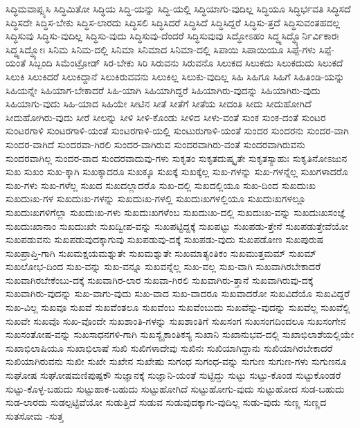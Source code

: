 {ಸಿದ್ಧಿಮವಾಪ್ಸ್ಯಸಿ
ಸಿದ್ಧಿಮಿತೋ
ಸಿದ್ಧಿಯ
ಸಿದ್ಧಿ-ಯನ್ನು
ಸಿದ್ಧಿ-ಯಲ್ಲಿ
ಸಿದ್ಧಿಯಾಗು-ವುದಿಲ್ಲ
ಸಿದ್ಧಿಯೂ
ಸಿದ್ಧಿರ್ಭವತಿ
ಸಿದ್ಧಿಸದೆ
ಸಿದ್ಧಿಸದೇ
ಸಿದ್ಧಿಸ-ಬೇಕು
ಸಿದ್ಧಿಸ-ಲಾರದು
ಸಿದ್ಧಿಸಲಿ
ಸಿದ್ಧಿಸಿದರೆ
ಸಿದ್ಧಿಸಿದೆ
ಸಿದ್ಧಿಸಿದ್ದರೆ
ಸಿದ್ಧಿಸು-ತ್ತದೆ
ಸಿದ್ಧಿಸುವಂತಹದಲ್ಲ
ಸಿದ್ಧಿಸುವು
ಸಿದ್ಧಿಸು-ವುದಿಲ್ಲ
ಸಿದ್ಧಿಸು-ವುದು
ಸಿದ್ಧಿಸುವು-ದೆಂದರೆ
ಸಿದ್ಧಿಸುವುವು
ಸಿದ್ಧೋಽಹಂ
ಸಿದ್ಧ್ಯಸಿದ್ಧ್ಯೊರ್ನಿರ್ವಿಕಾರಃ
ಸಿದ್ಧ್ಯಸಿದ್ಧ್ಯೋಃ
ಸಿನಿಮ
ಸಿನಿಮ-ದಲ್ಲಿ
ಸಿನಿಮಾ
ಸಿನಿಮಾದ
ಸಿನಿಮಾ-ದಲ್ಲಿ
ಸಿಪಾಯಿ
ಸಿಪಾಯಿಯೂ
ಸಿಪ್ಪೆ-ಗಳು
ಸಿಪ್ಪೆ-ಯಂತೆ
ಸಿಬ್ಬಂದಿ
ಸಿಮೆಂಟ್ರೋಡ್
ಸಿರ-ಬೇಕು
ಸಿರಿ
ಸಿರುವನು
ಸಿರುವನೊ
ಸಿಲುಕದ
ಸಿಲುಕದು
ಸಿಲುಕದುದು
ಸಿಲುಕದೆ
ಸಿಲುಕಿ
ಸಿಲುಕಿದರೆ
ಸಿಲುಕಿದ್ದಾನೆ
ಸಿಲುಕಿರುವವನು
ಸಿಲುಕಿಲ್ಲ
ಸಿಲುಕು-ವುದಿಲ್ಲ
ಸಿಹಿ
ಸಿಹಿಗೂ
ಸಿಹಿಗೆ
ಸಿಹಿತಿಂಡಿ-ಯನ್ನು
ಸಿಹಿಯನ್ನೇ
ಸಿಹಿಯಾಗ-ಬೇಕಾದರೆ
ಸಿಹಿ-ಯಾಗಿ
ಸಿಹಿಯಾಗಿದ್ದರೆ
ಸಿಹಿಯಾಗಿರು-ವುದನ್ನು
ಸಿಹಿಯಾಗಿರು-ವುದು
ಸಿಹಿಯಾಗು-ವುದು
ಸಿಹಿ-ಯಾದ
ಸಿಹಿಯೇ
ಸೀಟಿನ
ಸೀತೆ
ಸೀತೆಗೆ
ಸೀತೆಯ
ಸೀದಂತಿ
ಸೀದು
ಸೀದುಹೋಗಿದೆ
ಸೀದುಹೋಗಿರು-ವುದು
ಸೀರೆ
ಸೀಲನ್ನು
ಸೀಳಿ
ಸೀಳಿ-ಕೊಂಡು
ಸೀಳಿದ
ಸೀಳು-ವಂತೆ
ಸುಂಕ
ಸುಂಕ-ದಂತೆ
ಸುಂಟರ
ಸುಂಟರಗಾಳಿ
ಸುಂಟರಗಾಳಿ-ಯಂತೆ
ಸುಂಟರಗಾಳಿ-ಯಲ್ಲಿ
ಸುಂಟುರುಗಾಳಿ-ಯಂತೆ
ಸುಂದರ
ಸುಂದರನು
ಸುಂದರ-ವಾಗಿ
ಸುಂದರ-ವಾಗಿದೆ
ಸುಂದರವಾ-ಗಿರಲಿ
ಸುಂದರ-ವಾಗಿರುವ
ಸುಂದರವಾಗಿರು-ವಂತೆ
ಸುಂದರವಾಗಿರುವನು
ಸುಂದರವಾಗಿಲ್ಲ
ಸುಂದರ-ವಾದ
ಸುಂದರವಾದುವು-ಗಳು
ಸುಕೃತಂ
ಸುಕೃತದುಷ್ಕೃತೇ
ಸುಕೃತಸ್ಯಾಹುಃ
ಸುಕೃತಿನೋಽಜುನ
ಸುಖ
ಸುಖಂ
ಸುಖ-ಕ್ಕಾಗಿ
ಸುಖಕ್ಕಾದರೂ
ಸುಖಕ್ಕೂ
ಸುಖಕ್ಕೆ
ಸುಖಕ್ಕೆಲ್ಲ
ಸುಖ-ಗಳನ್ನು
ಸುಖ-ಗಳನ್ನೆಲ್ಲ
ಸುಖಗಳಾದರೊ
ಸುಖ-ಗಳು
ಸುಖ-ಗಳೆಲ್ಲ
ಸುಖದ
ಸುಖದಲ್ಲಾದರೊ
ಸುಖ-ದಲ್ಲಿ
ಸುಖದಲ್ಲಿಯೂ
ಸುಖ-ದಿಂದ
ಸುಖದುಃಖ
ಸುಖದುಃಖ-ಗಳ
ಸುಖದುಃಖ-ಗಳನ್ನು
ಸುಖದುಃಖ-ಗಳಲ್ಲಿ
ಸುಖದುಃಖಗಳಲ್ಲಿಯೂ
ಸುಖದುಃಖಗಳಲ್ಲೂ
ಸುಖದುಃಖಗಳಿಗೆಲ್ಲಾ
ಸುಖದುಃಖ-ಗಳು
ಸುಖದುಃಖಗಳೆಂಬ
ಸುಖದುಃಖ-ದಲ್ಲಿ
ಸುಖದುಃಖ-ವನ್ನು
ಸುಖದುಃಖಸಂಜ್ಞೆ
ಸುಖದುಃಖಾನಾಂ
ಸುಖದುಃಖೇ
ಸುಖದ್ವೀಪ-ವನ್ನು
ಸುಖಪಟ್ಟಿದ್ದಕ್ಕೆ
ಸುಖಪಟ್ಟು
ಸುಖಪಡು-ತ್ತೇನೆ
ಸುಖಪಡುತ್ತೇವೆಯೋ
ಸುಖಪಡುವನು
ಸುಖಪಡುವುದಕ್ಕಾಗುವು
ಸುಖಪಡುವು-ದಕ್ಕೆ
ಸುಖಪಡು-ವುದು
ಸುಖಪಡೋಣ
ಸುಖಪುರುಷ
ಸುಖಪ್ರಾಪ್ತಿ-ಗಾಗಿ
ಸುಖಮಕ್ಷಯಮಶ್ನುತೇ
ಸುಖಮಶ್ನುತೇ
ಸುಖಮಾತ್ಯಂತಿಕಂ
ಸುಖಮುತ್ತಮಮ್
ಸುಖಮ್
ಸುಖಲೋಭ-ದಿಂದ
ಸುಖ-ವನ್ನು
ಸುಖ-ವನ್ನೂ
ಸುಖವನ್ನೆಲ್ಲ
ಸುಖ-ವಲ್ಲ
ಸುಖ-ವಾಗಿ
ಸುಖವಾಗಿರಬೇಕಾದರೆ
ಸುಖವಾಗಿರಬೇಕೆಂಬು-ದಕ್ಕೆ
ಸುಖವಾಗಿರ-ಲಾರ
ಸುಖವಾ-ಗಿರಲಿ
ಸುಖವಾಗಿರು-ತ್ತಾನೆ
ಸುಖವಾಗಿರುವು-ದಕ್ಕೆ
ಸುಖವಾಗಿರು-ವುದನ್ನು
ಸುಖ-ವಾಗು-ವುದು
ಸುಖ-ವಾದ
ಸುಖ-ವಾದರೂ
ಸುಖವಾದರೋ
ಸುಖವಿದೆಯೊ
ಸುಖವಿದ್ದರೆ
ಸುಖ-ವಿಲ್ಲ
ಸುಖವೂ
ಸುಖವೆ
ಸುಖವೆಂತಲೂ
ಸುಖವೆಂಬ
ಸುಖವೆಂಬುದು
ಸುಖವೆನ್ನು-ವುದನ್ನು
ಸುಖವೆಲ್ಲ
ಸುಖವೆಲ್ಲಿ
ಸುಖವೇ
ಸುಖವೊ
ಸುಖ-ವೊಂದೇ
ಸುಖಶಾಂತಿ-ಗಳನ್ನು
ಸುಖಶಾಂತಿಗೆ
ಸುಖಸಂಗ
ಸುಖಸಂಗದಿಂದಲೂ
ಸುಖಸಂಗೇನ
ಸುಖಸಂತೋಷ-ವನ್ನು
ಸುಖಸಾಧನಗಳಿ-ಗಾಗಿ
ಸುಖಸ್ಯೈಕಾಂತಿಕಸ್ಯ
ಸುಖಾನಿ
ಸುಖಾನುಭವ-ದಲ್ಲಿ
ಸುಖಾಭಿಲಾಶೆಯಲ್ಲಿಯೇ
ಸುಖಾಭಿಲಾಷಿಯೂ
ಸುಖಾಭಿಲಾಷೆ
ಸುಖಿ
ಸುಖಿಗಳಾದೇವು
ಸುಖಿನಃ
ಸುಖಿಯಾಗಿದ್ದಾನು
ಸುಖಿಯಾಗಿರಬೇಕಾದರೆ
ಸುಖಿಯಾಗಿರುವನು
ಸುಖೀ
ಸುಖೇ
ಸುಖೇನ
ಸುಖೇಷು
ಸುಗಂಧ
ಸುಗಂಧ-ವನ್ನು
ಸುಗುಣ
ಸುಗುಣ-ಗಳು
ಸುಗುಣನೂ
ಸುಘೋಷ
ಸುಘೋಷಮಣಿಪುಷ್ಪಕೌ
ಸುಜ್ಞಾನಕ್ಕೆ
ಸುಜ್ಞಾನಿ-ಯಂತೆ
ಸುಟ್ಟಿದ್ದು
ಸುಟ್ಟು
ಸುಟ್ಟು-ಕೊಂಡ
ಸುಟ್ಟುಕೊಂಡರೆ
ಸುಟ್ಟು-ಕೊಳ್ಳ-ಬಹುದು
ಸುಟ್ಟುಹಾಕ-ಬಹುದು
ಸುಟ್ಟುಹೋಗಿದೆ
ಸುಟ್ಟುಹೋಗು-ವುದು
ಸುಟ್ಟುಹೋದ
ಸುಡ-ಬಹುದು
ಸುಡ-ಲಾರದು
ಸುಡಲ್ಪಟ್ಟಿವೆಯೋ
ಸುಡುತ್ತಿದೆ
ಸುಡುವ
ಸುಡುವುದಕ್ಕಾಗು-ವುದಿಲ್ಲ
ಸುಡು-ವುದು
ಸುಣ್ಣ
ಸುಣ್ಣದ
ಸುತಸೋಮ
-ಸುತ್ತ
}
